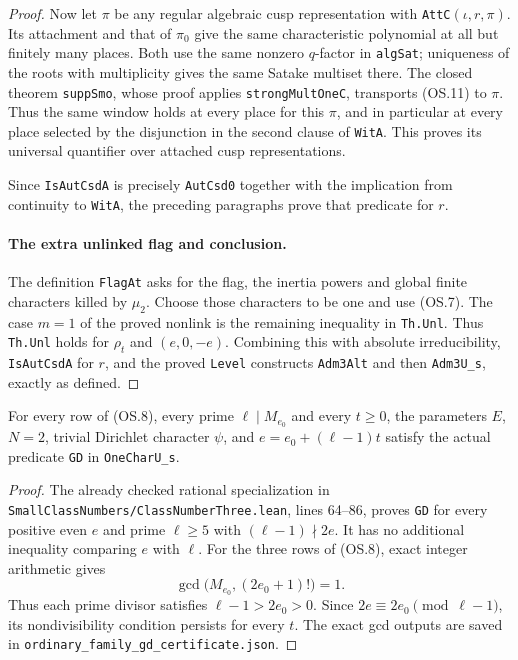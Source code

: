 \begin{proof}
Now let $\pi$ be any regular algebraic cusp representation
with \texttt{AttC}$(\iota,r,\pi)$. Its attachment and that of
$\pi_0$ give the same characteristic polynomial at all but
finitely many places. Both use the same nonzero $q$-factor
in \texttt{algSat}; uniqueness of the roots with
multiplicity gives the same Satake multiset there.
The closed theorem \texttt{suppSmo}, whose proof applies
\texttt{strongMultOneC}, transports (OS.11) to $\pi$.
Thus the same window holds at every place for this $\pi$,
and in particular at every place selected by the disjunction
in the second clause of \texttt{WitA}. This proves its
universal quantifier over attached cusp representations.

Since \texttt{IsAutCsdA} is precisely \texttt{AutCsd0}
together with the implication from continuity to
\texttt{WitA}, the preceding paragraphs prove that
predicate for $r$.

\paragraph{The extra unlinked flag and conclusion.}
The definition \texttt{FlagAt} asks for the flag, the
inertia powers and global finite characters killed by
$\mu_2$. Choose those characters to be one and use (OS.7).
The case $m=1$ of the proved nonlink is the remaining
inequality in \texttt{Th.Unl}. Thus \texttt{Th.Unl}
holds for $\rho_t$ and $(e,0,-e)$.
Combining this with absolute irreducibility,
\texttt{IsAutCsdA} for $r$, and the proved \texttt{Level}
constructs \texttt{Adm3Alt} and then
\texttt{Adm3U\_s}, exactly as defined.
\end{proof}

\begin{corollary}
For every row of (OS.8), every prime $\ell\mid M_{e_0}$
and every $t\geq0$, the parameters $E$, $N=2$, trivial
Dirichlet character $\psi$, and $e=e_0+(\ell-1)t$ satisfy
the actual predicate \texttt{GD} in \texttt{OneCharU\_s}.
\end{corollary}
\begin{proof}
The already checked rational specialization in
\texttt{SmallClassNumbers/ClassNumberThree.lean},
lines 64--86, proves \texttt{GD} for every positive even
$e$ and prime $\ell\geq5$ with $(\ell-1)\nmid2e$.
It has no additional inequality comparing $e$ with $\ell$.
For the three rows of (OS.8), exact integer arithmetic gives
\[
                   \gcd\bigl(M_{e_0},(2e_0+1)!\bigr)=1.
\]
Thus each prime divisor satisfies $\ell-1>2e_0>0$.
Since $2e\equiv2e_0\pmod{\ell-1}$, its nondivisibility
condition persists for every $t$. The exact gcd outputs
are saved in \texttt{ordinary\_family\_gd\_certificate.json}.
\end{proof}

